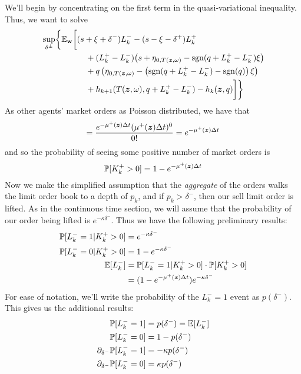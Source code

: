 We'll begin by concentrating on the first term in the quasi-variational inequality. Thus, we want to solve
\begin{equation}
\label{eq:discretesup1}
\begin{split}
& \sup_{\delta^\pm} \biggl\lbrace \E_{\bw} \biggl[
(s + \xi + \delta^-)L_k^- - (s - \xi - \delta^+)L_k^+ \\
& \hphantom{\sup_{\bu} \biggl\lbrace \E_{\bw} \biggl[ {}+{}} + (L_k^+ - L_k^-) \bigl( s + \eta_{0,T(\bz, \omega)}  -\sgn( q + L_k^+ - L_k^-)\xi   \bigr) \\
& \hphantom{\sup_{\bu} \biggl\lbrace \E_{\bw} \biggl[ {}+{}} + q\left( \eta_{0,T(\bz, \omega)}  -\left( \sgn( q + L_k^+ - L_k^-) - \sgn(q) \right) \xi \right) \\
& \hphantom{\sup_{\bu} \biggl\lbrace \E_{\bw} \biggl[ {}+{}} + h_{k+1}(T(\bz,\omega), q + L_k^+ - L_k^- ) -  h_k(\bz,q) \biggr] \biggr\rbrace
\end{split}
\end{equation}
As other agents' market orders as Poisson distributed, we have that 
\begin{equation}
[ K_k^+ = 0] = \frac{e^{-\mu^+ (\bz) \Delta t} (\mu^+ (\bz) \Delta t)^0}{0!} = e^{-\mu^+ (\bz) \Delta t}
\end{equation}
and so the probability of seeing some positive number of market orders is
\begin{equation}
\label{eq:discretepositiveKplus}
\mathbb{P} [ K_k^+ > 0] = 1 - e^{-\mu^+ (\bm{z}) \Delta t}
\end{equation}
Now we make the simplified assumption that the \textit{aggregate} of the orders walks the limit order book to a depth of $p_k$, and if $p_k > \delta^-$, then our sell limit order is lifted. As in the continuous time section, we will assume that the probability of our order being lifted is $e^{-\kappa \delta^-}$. Thus we have the following preliminary results:
\begin{align}
\mathbb{P} [ L_k^- = 1 | K_k^+ > 0] & = e^{-\kappa \delta^-} \\
\mathbb{P} [ L_k^- = 0 | K_k^+ > 0] & = 1 - e^{-\kappa \delta^-} \\
\mathbb{E} [ L_k^- ] & = \mathbb{P} [ L_k^- = 1 | K_k^+ > 0] \cdot \mathbb{P}[K_k^+ > 0] \\
& = ( 1 - e^{-\mu^+ (\bm{z}) \Delta t} ) e^{-\kappa \delta^-}
\end{align}
For ease of notation, we'll write the probability of the $L_k^- = 1$ event as $p(\delta^-)$. This gives us the additional results:
\begin{align}
\mathbb{P} [ L_k^- = 1] & = p(\delta^-) = \mathbb{E} [ L_k^-] \\
\mathbb{P} [ L_k^- = 0] & = 1 - p(\delta^-) \\
\partial_{\delta^-} \mathbb{P} [ L_k^- = 1]  & = -\kappa p(\delta^-) \\
\partial_{\delta^-} \mathbb{P} [ L_k^- = 0] & = \kappa p(\delta^-)
\end{align}
